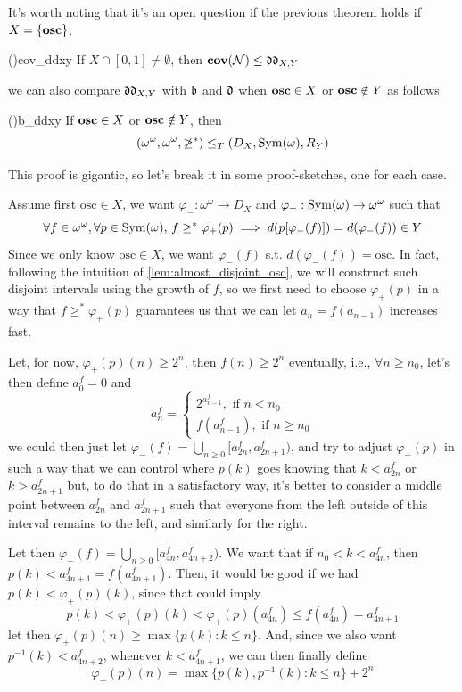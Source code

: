 It's worth noting that it's an open question if the previous theorem holds if $X=\{\mathbf{osc}\}$.

\begin{corollary}{(\cite{brech})}{cov_ddxy}
    If $X\cap[0,1]\neq\emptyset$, then $\textbf{cov}(\mathcal{N})\leq\mathfrak{dd}_{X,Y}$
\end{corollary}

we can also compare $\mathfrak{dd}_{X,Y}$ with $\mathfrak{b}$ and $\mathfrak{d}$ when $\mathbf{osc}\in X$ or $\mathbf{osc}\notin Y$ as follows

\begin{theorem}{(\cite{brech})}{b_ddxy}
    If $\mathbf{osc}\in X$ or $\mathbf{osc}\notin Y$, then
    $$(\omega^\omega,\omega^\omega,\not\geq^*)\leq_T(D_X,\mathrm{Sym}(\omega),R_Y)$$
\end{theorem}

This proof is gigantic, so let's break it in some proof-sketches, one for each case.

\begin{sketch}
    Assume first $\text{osc}\in X$, we want $\varphi_-:\omega^\omega\to D_X$ and $\varphi_+:\mathrm{Sym}(\omega)\to\omega^\omega$ such that
    $$\forall f\in\omega^\omega,\forall p\in\mathrm{Sym}(\omega),\,f\geq^*\varphi_+(p)\implies d(p[\varphi_-(f)])=d(\varphi_-(f))\in Y$$
    Since we only know $\text{osc}\in X$, we want $\varphi_-(f)$ s.t. $d(\varphi_-(f))=\text{osc}$. In fact, following the intuition of \ref{lem:almost_disjoint_osc}, we will construct such disjoint intervals using the growth of $f$, so we first need to choose $\varphi_+(p)$ in a way that $f\geq^*\varphi_+(p)$ guarantees us that we can let $a_n=f(a_{n-1})$ increases fast.

    Let, for now, $\varphi_+(p)(n)\geq 2^n$, then $f(n)\geq 2^n$ eventually, i.e., $\forall n\geq n_0$, let's then define $a_0^f=0$ and
    $$a_n^f=\begin{cases}
        2^{a^f_{n-1}},\text{ if }n<n_0\\
        f(a_{n-1}^f),\text{ if }n\geq n_0
    \end{cases}$$
    we could then just let $\varphi_-(f)=\bigcup_{n\geq0}[a_{2n}^f,a_{2n+1}^f)$, and try to adjust $\varphi_+(p)$ in such a way that we can control where $p(k)$ goes knowing that $k<a_{2n}^f$ or $k>a_{2n+1}^f$ but, to do that in a satisfactory way, it's better to consider a middle point between $a_{2n}^f$ and $a_{2n+1}^f$ such that everyone from the left outside of this interval remains to the left, and similarly for the right.

    Let then $\varphi_-(f)=\bigcup_{n\geq0}[a_{4n}^f,a_{4n+2}^f)$. We want that if $n_0<k<a_{4n}^f$, then $p(k)<a_{4n+1}^f=f(a_{4n+1}^f)$. Then, it would be good if we had $p(k)<\varphi_+(p)(k)$, since that could imply
    $$p(k)<\varphi_+(p)(k)<\varphi_+(p)(a_{4n}^f)\leq f(a_{4n}^f)=a_{4n+1}^f$$
    let then $\varphi_+(p)(n)\geq\max\{p(k):k\leq n\}$. And, since we also want $p^{-1}(k)<a_{4n+2}^f$, whenever $k<a_{4n+1}^f$, we can then finally define
    $$\varphi_+(p)(n)=\max\{p(k),p^{-1}(k):k\leq n\}+2^n$$
\end{sketch}

